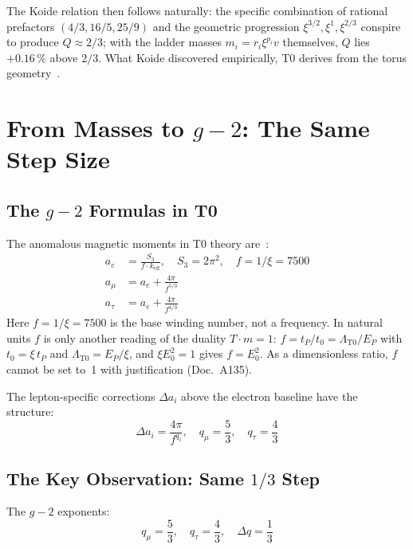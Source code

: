 The Koide relation then follows naturally: the specific combination of rational prefactors $(4/3, 16/5, 25/9)$ and the geometric progression $\xi^{3/2}, \xi^1, \xi^{2/3}$ conspire to produce $Q \approx 2/3$; with the ladder masses $m_i = r_i\xi^{p_i}v$ themselves, $Q$ lies $+0.16\,\%$ above $2/3$. What Koide discovered empirically, T0 derives from the torus geometry~\cite{Pascher116}.

\section{From Masses to $g-2$: The Same Step Size}

\subsection{The $g-2$ Formulas in T0}

The anomalous magnetic moments in T0 theory are~\cite{Pascher018}:
\begin{align}
	a_e &= \frac{S_3}{f \cdot k_\text{eff}}, \quad S_3 = 2\pi^2, \quad f = 1/\xi = 7500 \\
	a_\mu &= a_e + \frac{4\pi}{f^{5/3}} \\
	a_\tau &= a_e + \frac{4\pi}{f^{4/3}}
\end{align}
Here $f = 1/\xi = 7500$ is the base winding number, not a frequency. In natural units $f$ is only another reading of the duality $T\cdot m = 1$: $f = t_P/t_0 = \Lambda_{\text{T0}}/E_P$ with $t_0 = \xi\,t_P$ and $\Lambda_{\text{T0}} = E_P/\xi$, and $\xi E_0^2 = 1$ gives $f = E_0^2$. As a dimensionless ratio, $f$ cannot be set to~1 with justification (Doc.~A135).

The lepton-specific corrections $\Delta a_i$ above the electron baseline have the structure:
\begin{equation}
	\Delta a_i = \frac{4\pi}{f^{q_i}}, \quad q_\mu = \frac{5}{3}, \quad q_\tau = \frac{4}{3}
	\label{eq:g2exponents}
\end{equation}

\subsection{The Key Observation: Same $1/3$ Step}

The $g-2$ exponents:
\begin{equation}
	q_\mu = \frac{5}{3}, \quad q_\tau = \frac{4}{3}, \quad \Delta q = \frac{1}{3}
\end{equation}

